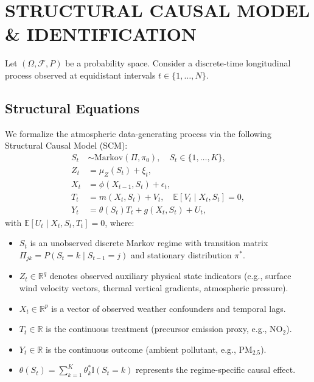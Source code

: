 \documentclass[twoside]{article}
\theoremstyle{definition}
\newcommand{\E}{\mathbb{E}}
\newcommand{\R}{\mathbb{R}}
\newcommand{\one}{\mathbb{I}}
\begin{document}
\section{STRUCTURAL CAUSAL MODEL \& IDENTIFICATION}
\label{sec:setup}

Let $(\Omega, \mathcal{F}, P)$ be a probability space. Consider a discrete-time longitudinal process observed at equidistant intervals $t \in \{1, \dots, N\}$.

\subsection{Structural Equations}
We formalize the atmospheric data-generating process via the following Structural Causal Model (SCM):
\begin{align}
    S_t &\sim \text{Markov}(\Pi, \pi_0), \quad S_t \in \{1, \dots, K\}, \label{eq:regime_scm} \\
    Z_t &= \mu_Z(S_t) + \xi_t, \label{eq:state_obs} \\
    X_t &= \phi(X_{t-1}, S_t) + \epsilon_t, \label{eq:confounders} \\
    T_t &= m(X_t, S_t) + V_t, \quad \E[V_t \mid X_t, S_t] = 0, \label{eq:treatment} \\
    Y_t &= \theta(S_t) T_t + g(X_t, S_t) + U_t, \label{eq:outcome}
\end{align}
with $\E[U_t \mid X_t, S_t, T_t] = 0$, where:
\begin{itemize}\setlength{\itemsep}{-2pt}\setlength{\parskip}{0pt}
    \item $S_t$ is an unobserved discrete Markov regime with transition matrix $\Pi_{jk} = P(S_t = k \mid S_{t-1} = j)$ and stationary distribution $\pi^*$.
    \item $Z_t \in \R^q$ denotes observed auxiliary physical state indicators (e.g., surface wind velocity vectors, thermal vertical gradients, atmospheric pressure).
    \item $X_t \in \R^p$ is a vector of observed weather confounders and temporal lags.
    \item $T_t \in \R$ is the continuous treatment (precursor emission proxy, e.g., $\text{NO}_2$).
    \item $Y_t \in \R$ is the continuous outcome (ambient pollutant, e.g., $\text{PM}_{2.5}$).
    \item $\theta(S_t) = \sum_{k=1}^K \theta_k^* \one(S_t = k)$ represents the regime-specific causal effect.
\end{itemize}
\end{document}
